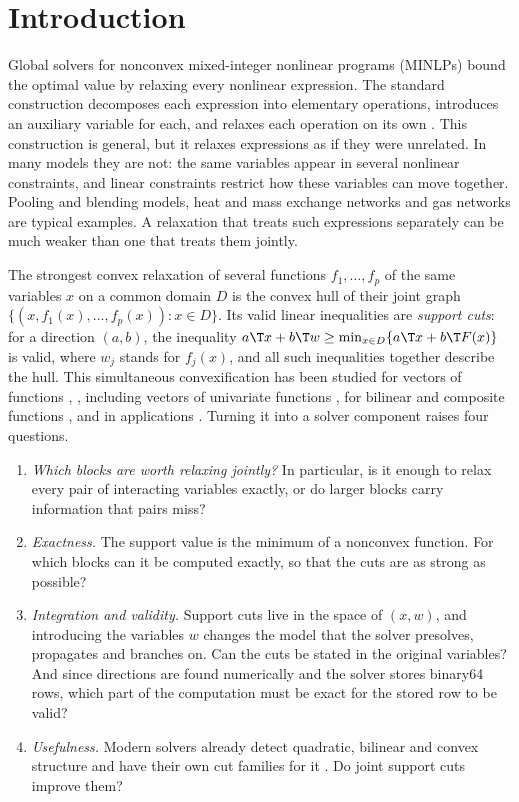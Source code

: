 \section{Introduction}\label{sec:introduction}

Global solvers for nonconvex mixed-integer nonlinear programs (MINLPs) bound
the optimal value by relaxing every nonlinear expression. The standard
construction decomposes each expression into elementary operations,
introduces an auxiliary variable for each, and relaxes each operation on its
own \citep{McCormick1976,SmithPantelides1999,TawarmalaniSahinidis2004}. This
construction is general, but it relaxes expressions as if they were
unrelated. In many models they are not: the same variables appear in several
nonlinear constraints, and linear constraints restrict how these variables
can move together. Pooling and blending models, heat and mass exchange
networks and gas networks are typical examples. A relaxation that treats such
expressions separately can be much weaker than one that treats them jointly.

The strongest convex relaxation of several functions $f_1,\dots,f_p$ of the
same variables $x$ on a common domain $D$ is the convex hull of their joint
graph $\{(x,f_1(x),\dots,f_p(x)):x\in D\}$. Its valid linear inequalities are
\emph{support cuts}: for a direction $(a,b)$, the inequality
$a\T x+b\T w\ge\min_{x\in D}\{a\T x+b\T F(x)\}$ is valid, where $w_j$ stands for
$f_j(x)$, and all such inequalities together describe the hull. This
simultaneous convexification has been studied for vectors of functions
\citep{Tawarmalani2010}, \citep[Proposition~1]{LiersEtAl2021}, including
vectors of univariate functions \citep{HeLiuTawarmalani2025}, for bilinear and
composite functions
\citep{DavarniaRichardTawarmalani2017,HeTawarmalani2021,ZhuHeTawarmalani2026},
and in applications \citep{LiersEtAl2021}.
Turning it into a solver component raises four questions.
\begin{enumerate}[label=(\arabic*)]
\item \emph{Which blocks are worth relaxing jointly?} In particular, is it
enough to relax every pair of interacting variables exactly, or do larger
blocks carry information that pairs miss?
\item \emph{Exactness.} The support value is the minimum of a nonconvex
function. For which blocks can it be computed exactly, so that the cuts are
as strong as possible?
\item \emph{Integration and validity.} Support cuts live in the space of
$(x,w)$, and introducing the variables $w$ changes the model that the solver
presolves, propagates and branches on. Can the cuts be stated in the original
variables? And since directions are found numerically and the solver stores
binary64 rows, which part of the computation must be exact for the stored row
to be valid?
\item \emph{Usefulness.} Modern solvers already detect quadratic, bilinear and
convex structure and have their own cut families for it
\citep{BestuzhevaEtAl2025}. Do joint support cuts improve them?
\end{enumerate}


